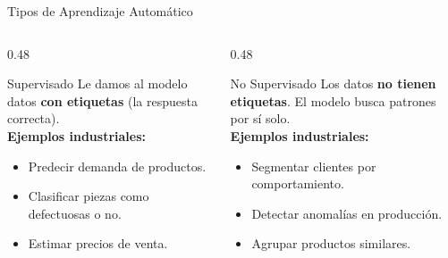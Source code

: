 \documentclass[aspectratio=169]{beamer}
\begin{document}
\begin{frame}{Tipos de Aprendizaje Automático}
  \begin{columns}[T]
    \begin{column}{0.48\textwidth}
      \begin{conceptbox}{\faTag\enspace Supervisado}
        \small
        Le damos al modelo datos \textbf{con etiquetas}
        (la respuesta correcta).\\[4pt]
        \textbf{Ejemplos industriales:}
        \begin{itemize}\setlength\itemsep{2pt}
          \item Predecir demanda de productos.
          \item Clasificar piezas como defectuosas o no.
          \item Estimar precios de venta.
        \end{itemize}
      \end{conceptbox}
    \end{column}
    \begin{column}{0.48\textwidth}
      \begin{conceptbox}{\faObjectGroup\enspace No Supervisado}
        \small
        Los datos \textbf{no tienen etiquetas}. El modelo
        busca patrones por sí solo.\\[4pt]
        \textbf{Ejemplos industriales:}
        \begin{itemize}\setlength\itemsep{2pt}
          \item Segmentar clientes por comportamiento.
          \item Detectar anomalías en producción.
          \item Agrupar productos similares.
        \end{itemize}
      \end{conceptbox}
    \end{column}
  \end{columns}
\end{frame}
\end{document}
